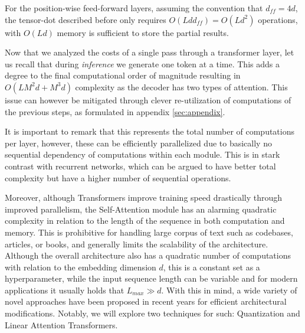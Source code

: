 For the position-wise feed-forward layers, assuming the convention that $d_{ff} = 4d$, the tensor-dot described before only requires $O(Ldd_{ff}) = O(Ld^2)$ operations, with $O(Ld)$ memory is sufficient to store the partial results.



\vspace{0.5em}

Now that we analyzed the costs of a single pass through a transformer layer, let us recall that during \textit{inference} we generate one token at a time. This adds a degree to the final computational order of magnitude resulting in $O(LM^2d + M^3d)$ complexity as the decoder has two types of attention. This issue can however be mitigated through clever re-utilization of computations of the previous steps, as formulated in   appendix \ref{sec:appendix}.

\vspace{0.5em}

It is important to remark that this represents the total number of computations per layer, however, these can be efficiently parallelized due to basically no sequential dependency of computations within each module. This is in stark contrast with recurrent networks, which can be argued to have better total complexity but have a higher number of sequential operations.

Moreover, although Transformers improve training speed drastically through improved parallelism, the Self-Attention module has an alarming quadratic complexity in relation to the length of the sequence in both computation and memory. 
This is prohibitive for handling large corpus of text such as codebases, articles, or books, and generally limits the scalability of the architecture. 
Although the overall architecture also has a quadratic number of computations with relation to the embedding dimension $d$, this is a constant set as a hyperparameter, while the input sequence length can be variable and for modern applications it usually holds that $L_{max} \gg d$. With this in mind, a wide variety of novel approaches have been proposed in recent years for efficient architectural modifications. Notably, we will explore two techniques for such:  Quantization and Linear Attention Transformers.
